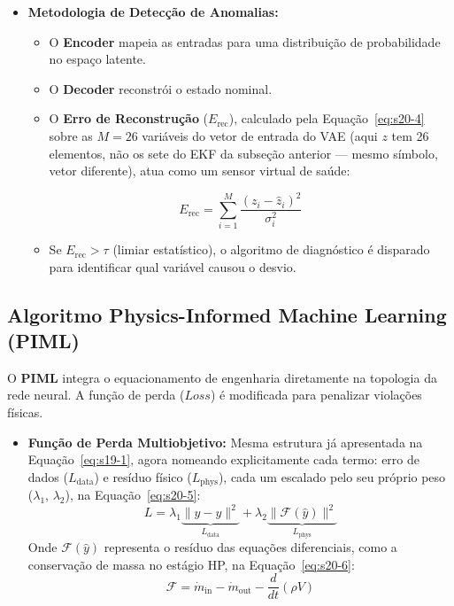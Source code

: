 \documentclass[12pt,a4paper]{article}
\numberwithin{equation}{section}
\numberwithin{table}{section}
\numberwithin{figure}{section}
\begin{document}
	\begin{itemize}
		\item \textbf{Metodologia de Detecção de Anomalias:}
		\begin{itemize}
			\item O \textbf{Encoder} mapeia as entradas para uma distribuição de probabilidade no espaço latente.
			\item O \textbf{Decoder} reconstrói o estado nominal.
			\item O \textbf{Erro de Reconstrução} ($E_{\text{rec}}$), calculado pela Equação~\eqref{eq:s20-4} sobre as $M=26$ variáveis do vetor de entrada do VAE (aqui $z$ tem 26 elementos, não os sete do EKF da subseção anterior — mesmo símbolo, vetor diferente), atua como um sensor virtual de saúde:
		\end{itemize}
		\begin{equation}\label{eq:s20-4}
 E_{\text{rec}} = \sum_{i=1}^{M} \frac{(z_i - \hat{z}_i)^2}{\sigma_i^2} 
\end{equation}
		\begin{itemize}
			\item Se $E_{\text{rec}} > \tau$ (limiar estatístico), o algoritmo de diagnóstico é disparado para identificar qual variável causou o desvio.
		\end{itemize}
	\end{itemize}
	
	\subsection{Algoritmo Physics-Informed Machine Learning (PIML)}
	
	O \textbf{PIML} integra o equacionamento de engenharia diretamente na topologia da rede neural. A função de perda ($Loss$) é modificada para penalizar violações físicas.
	
	\begin{itemize}
		\item \textbf{Função de Perda Multiobjetivo:} Mesma estrutura já apresentada na Equação~\eqref{eq:s19-1}, agora nomeando explicitamente cada termo: erro de dados ($L_{\text{data}}$) e resíduo físico ($L_{\text{phys}}$), cada um escalado pelo seu próprio peso ($\lambda_1$, $\lambda_2$), na Equação~\eqref{eq:s20-5}:
		\begin{equation}\label{eq:s20-5}
 L = \lambda_1 \underbrace{\| y - \hat{y} \|^2}_{L_{\text{data}}} + \lambda_2 \underbrace{\| \mathcal{F}(\hat{y}) \|^2}_{L_{\text{phys}}}
\end{equation}
		Onde $\mathcal{F}(\hat{y})$ representa o resíduo das equações diferenciais, como a conservação de massa no estágio HP, na Equação~\eqref{eq:s20-6}:
		\begin{equation}\label{eq:s20-6}
 \mathcal{F} = \dot{m}_{\text{in}} - \dot{m}_{\text{out}} - \frac{d}{dt} (\rho V) 
\end{equation}
	\end{itemize}
	
\end{document}

